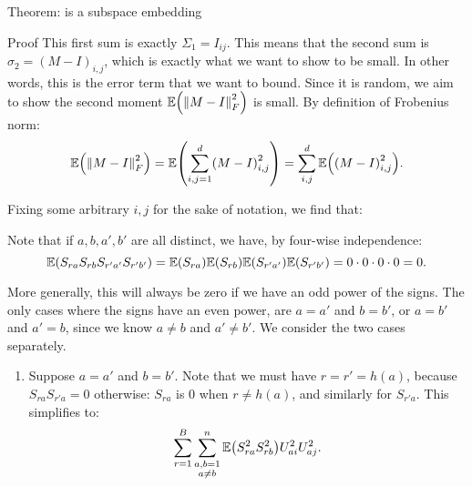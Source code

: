 \documentclass[a4paper]{article}
\begin{document}
\begin{parag}{Theorem:  is a subspace embedding}
\begin{subparag}{Proof}
        This first sum is exactly $\Sigma_1 = I_{i j}$. This means that the second sum is $\sigma_2 = \left(M - I\right)_{i, j}$, which is exactly what we want to show to be small. In other words, this is the error term that we want to bound. Since it is random, we aim to show the second moment $\exval\left(\left\|M - I\right\|_F^2\right)$ is small. By definition of Frobenius norm: 
        \[\exval\left(\left\|M - I\right\|_F^2\right) = \exval\left(\sum_{i,j=1}^{d} \left(M - I\right)^2_{i, j}\right) = \sum_{i, j}^{d} \exval\left(\left(M - I\right)^2_{i, j}\right).\]

        Fixing some arbitrary $i, j$ for the sake of notation, we find that: 
        
        Note that if $a, b, a', b'$ are all distinct, we have, by four-wise independence: 
        \[\exval\left(S_{ra} S_{r b} S_{r' a'} S_{r' b'}\right) = \exval\left(S_{ra}\right) \exval\left(S_{r b}\right) \exval\left(S_{r' a'}\right) \exval\left(S_{r' b'}\right) = 0\cdot 0\cdot 0\cdot 0 = 0.\]

        More generally, this will always be zero if we have an odd power of the signs. The only cases where the signs have an even power, are $a = a'$ and $b = b'$, or $a = b'$ and $a' = b$, since we know $a \neq b$ and $a' \neq b'$. We consider the two cases separately.
        \begin{enumerate}[left=0pt]
            \item Suppose $a = a'$ and $b = b'$. Note that we must have $r = r' = h\left(a\right)$, because $S_{ra} S_{r' a} = 0$ otherwise: $S_{ra}$ is 0 when $r \neq h\left(a\right)$, and similarly for $S_{r' a}$. This simplifies to: 
            \[\sum_{r=1}^{B} \sum_{\substack{a, b = 1 \\ a \neq b}}^{n} \exval\left(S_{r a}^2 S_{r b}^2\right) U_{ai}^2 U_{a j}^2.\]
            

\end{enumerate}
\end{subparag}
\end{parag}
\end{document}
